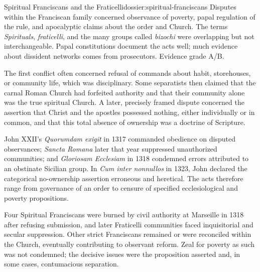 \begin{heresydossier}{Spiritual Franciscans and the Fraticelli}{dossier:spiritual-franciscans}
\objectfield Disputes within the Franciscan family concerned observance of poverty, papal regulation of the rule, and apocalyptic claims about the order and Church. The terms \emph{Spirituals}, \emph{fraticelli}, and the many groups called \emph{bizochi} were overlapping but not interchangeable. Papal constitutions document the acts well; much evidence about dissident networks comes from prosecutors. Evidence grade A/B.

\propositionfield The first conflict often concerned refusal of commands about habit, storehouses, or community life, which was disciplinary. Some separatists then claimed that the carnal Roman Church had forfeited authority and that their community alone was the true spiritual Church. A later, precisely framed dispute concerned the assertion that Christ and the apostles possessed nothing, either individually or in common, and that this total absence of ownership was a doctrine of Scripture.

\responsefield John XXII's \emph{Quorumdam exigit} in 1317 commanded obedience on disputed observances; \emph{Sancta Romana} later that year suppressed unauthorized communities; and \emph{Gloriosam Ecclesiam} in 1318 condemned errors attributed to an obstinate Sicilian group. In \emph{Cum inter nonnullos} in 1323, John declared the categorical no-ownership assertion erroneous and heretical. The acts therefore range from governance of an order to censure of specified ecclesiological and poverty propositions.

\aftermathfield Four Spiritual Franciscans were burned by civil authority at Marseille in 1318 after refusing submission, and later Fraticelli communities faced inquisitorial and secular suppression. Other strict Franciscans remained or were reconciled within the Church, eventually contributing to observant reform. Zeal for poverty as such was not condemned; the decisive issues were the proposition asserted and, in some cases, contumacious separation.
\end{heresydossier}


